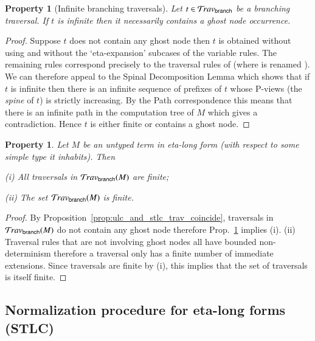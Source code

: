 \documentclass{elsarticle}
\theoremstyle{plain}
\newtheorem{property}[theorem]{Property}
\theoremstyle{definition}
\theoremstyle{remark}
\newcommand{\ghostlmd}{{\lambda\!\!\lambda}}
\newcommand{\branching}{{\sf branch}}
\newcommand{\travsetbr}{{\travset_\branching}}
\begin{document}
\begin{property}[Infinite branching traversals]
\label{prop:branching_spine_property}
Let $t\in \travsetbr$ be a branching traversal. If $t$ is infinite then it necessarily contains a ghost node occurrence.
\end{property}
\begin{proof}
Suppose $t$ does not contain any ghost node then
$t$ is obtained without using \rulenamet{Lam^\ghostlmd_\branching} and without the `eta-expansion' subcases of the variable rules. The remaining rules correspond precisely to the traversal rules of
\cite{Ong2006} (where  is renamed ).
We can therefore appeal to the Spinal Decomposition Lemma
\cite[Lemma 14]{Ong2006} which shows that if $t$ is infinite then there is an infinite sequence of prefixes of $t$ whose P-views (the \emph{spine} of $t$) is strictly increasing. By the Path correspondence this means that there is an infinite path in the computation tree of $M$ which gives a contradiction. Hence $t$ is either finite or contains a ghost node.
\end{proof}

\begin{property}
\label{prop:etalong_trav_finite}
Let $M$ be an untyped term in eta-long form (with respect to some simple type it inhabits). Then
\begin{enumerate*}
\item[(i)] All traversals in $\travsetbr(M)$ are finite;
\item[(ii)] The set $\travsetbr(M)$ is finite.
\end{enumerate*}
\end{property}
\begin{proof}
By Proposition~\ref{prop:ulc_and_stlc_trav_coincide}, traversals in $\travsetbr(M)$ do not contain any ghost node therefore Prop.~\ref{prop:branching_spine_property} implies (i).
(ii) Traversal rules that are not involving ghost nodes all have bounded non-determinism therefore a traversal only has a finite number of immediate extensions. Since traversals are finite by (i), this implies that the set of traversals is itself finite.
\end{proof}


\subsection{Normalization procedure for eta-long forms (STLC)}
\end{document}
